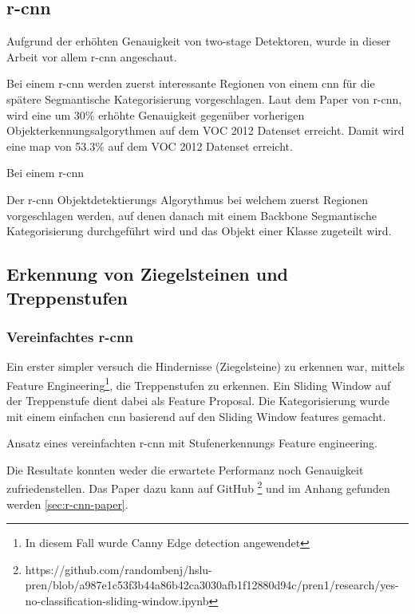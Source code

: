 \subsection{\acrfull{r-cnn}}

Aufgrund der erhöhten Genauigkeit von two-stage Detektoren, wurde in dieser Arbeit vor allem \acrshort{r-cnn} angeschaut.

Bei einem \acrshort{r-cnn} \cite{girshick2014rich} werden zuerst interessante Regionen von einem \acrshort{cnn} für die 
spätere Segmantische Kategorisierung vorgeschlagen. Laut dem Paper von \acrshort{r-cnn}, wird eine um 30\% erhöhte Genauigkeit 
gegenüber vorherigen Objekterkennungsalgorythmen auf dem VOC 2012 Datenset erreicht. Damit wird eine \acrfull{map} von 53.3\%
auf dem VOC 2012 Datenset erreicht.

Bei einem \acrshort{r-cnn} 

{
  Der \acrfull{r-cnn} \cite{girshick2014rich} Objektdetektierungs Algorythmus bei welchem zuerst Regionen 
  vorgeschlagen werden, auf denen danach mit einem Backbone Segmantische Kategorisierung durchgeführt wird und
  das Objekt einer Klasse zugeteilt wird.
}

\subsection{Erkennung von Ziegelsteinen und Treppenstufen}

\subsubsection{Vereinfachtes \acrshort{r-cnn}}

Ein erster simpler versuch die Hindernisse (Ziegelsteine) zu erkennen war, mittels Feature Engineering\footnote{
In diesem Fall wurde Canny Edge detection \cite{canny-edge-detection} angewendet}, die Treppenstufen zu
erkennen. Ein Sliding Window auf der Treppenstufe dient dabei als Feature Proposal.
Die Kategorisierung wurde mit einem einfachen \acrshort{cnn} basierend auf den Sliding Window features 
gemacht.

{
Ansatz eines vereinfachten \acrshort{r-cnn} mit Stufenerkennungs Feature engineering.
}

Die Resultate konnten weder die erwartete Performanz noch Genauigkeit zufriedenstellen.
Das Paper dazu kann auf GitHub \footnote{
https://github.com/randombenj/hslu-pren/blob/a987e1c53f3b44a86b42ca3030afb1f12880d94c/pren1/research/yes-no-classification-sliding-window.ipynb
} und im Anhang gefunden werden \ref{sec:r-cnn-paper}.


